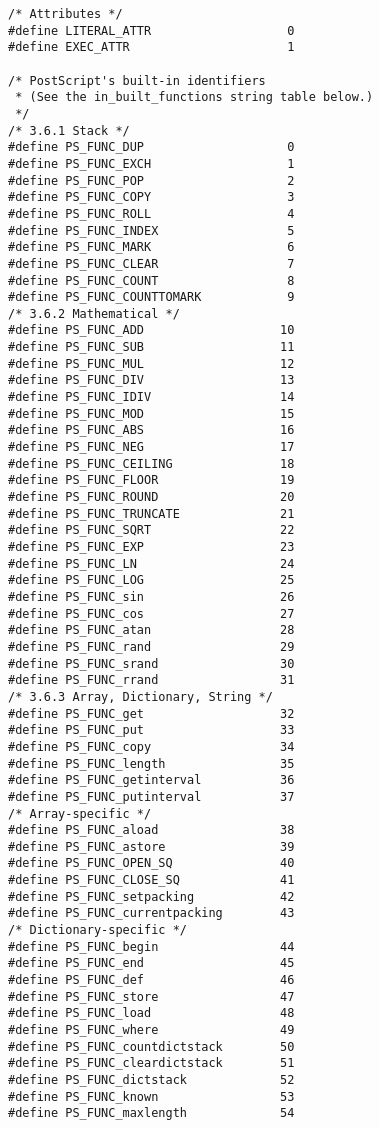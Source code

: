 \begin{lstlisting}
/* Attributes */
#define LITERAL_ATTR                   0
#define EXEC_ATTR                      1

/* PostScript's built-in identifiers
 * (See the in_built_functions string table below.)
 */
/* 3.6.1 Stack */
#define PS_FUNC_DUP                    0
#define PS_FUNC_EXCH                   1
#define PS_FUNC_POP                    2
#define PS_FUNC_COPY                   3
#define PS_FUNC_ROLL                   4
#define PS_FUNC_INDEX                  5
#define PS_FUNC_MARK                   6
#define PS_FUNC_CLEAR                  7
#define PS_FUNC_COUNT                  8
#define PS_FUNC_COUNTTOMARK            9
/* 3.6.2 Mathematical */
#define PS_FUNC_ADD                   10
#define PS_FUNC_SUB                   11
#define PS_FUNC_MUL                   12
#define PS_FUNC_DIV                   13
#define PS_FUNC_IDIV                  14
#define PS_FUNC_MOD                   15
#define PS_FUNC_ABS                   16
#define PS_FUNC_NEG                   17
#define PS_FUNC_CEILING               18
#define PS_FUNC_FLOOR                 19
#define PS_FUNC_ROUND                 20
#define PS_FUNC_TRUNCATE              21
#define PS_FUNC_SQRT                  22
#define PS_FUNC_EXP                   23
#define PS_FUNC_LN                    24
#define PS_FUNC_LOG                   25
#define PS_FUNC_sin                   26
#define PS_FUNC_cos                   27
#define PS_FUNC_atan                  28
#define PS_FUNC_rand                  29
#define PS_FUNC_srand                 30
#define PS_FUNC_rrand                 31
/* 3.6.3 Array, Dictionary, String */
#define PS_FUNC_get                   32
#define PS_FUNC_put                   33
#define PS_FUNC_copy                  34
#define PS_FUNC_length                35
#define PS_FUNC_getinterval           36
#define PS_FUNC_putinterval           37
/* Array-specific */
#define PS_FUNC_aload                 38
#define PS_FUNC_astore                39
#define PS_FUNC_OPEN_SQ               40
#define PS_FUNC_CLOSE_SQ              41
#define PS_FUNC_setpacking            42
#define PS_FUNC_currentpacking        43
/* Dictionary-specific */
#define PS_FUNC_begin                 44
#define PS_FUNC_end                   45
#define PS_FUNC_def                   46
#define PS_FUNC_store                 47
#define PS_FUNC_load                  48
#define PS_FUNC_where                 49
#define PS_FUNC_countdictstack        50
#define PS_FUNC_cleardictstack        51
#define PS_FUNC_dictstack             52
#define PS_FUNC_known                 53
#define PS_FUNC_maxlength             54

\end{lstlisting}
